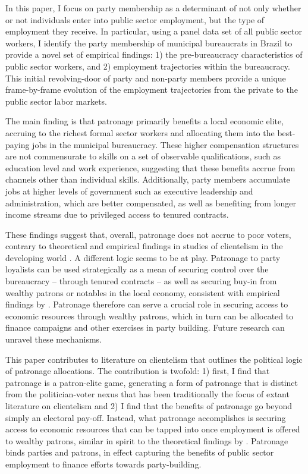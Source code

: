 In this paper, I focus on party membership as a determinant of not only whether or not individuals enter into public sector employment, but the type of employment they receive. In particular, using a panel data set of all public sector workers, I identify the party membership of municipal bureaucrats in Brazil to provide a novel set of empirical findings: 1) the pre-bureaucracy characteristics of public sector workers, and 2) employment trajectories within the bureaucracy. This initial revolving-door of party and non-party members provide a unique frame-by-frame evolution of the employment trajectories from the private to the public sector labor markets.

The main finding is that patronage primarily benefits a local economic elite, accruing to the richest formal sector workers and allocating them into the best-paying jobs in the municipal bureaucracy. These higher compensation structures are not commensurate to skills on a set of observable qualifications, such as education level and work experience, suggesting that these benefits accrue from channels other than individual skills. Additionally, party members accumulate jobs at higher levels of government such as executive leadership and administration, which are better compensated, as well as benefiting from longer income streams due to privileged access to tenured contracts.

These findings suggest that, overall, patronage does not accrue to poor voters, contrary to theoretical and empirical findings in studies of clientelism in the developing world \citep{stokes2013brokers}. A different logic seems to be at play. Patronage to party loyalists can be used strategically as a mean of securing control over the bureaucracy -- through tenured contracts -- as well as securing buy-in from wealthy patrons or notables in the local economy, consistent with empirical findings by \citet{colonnelli2018patronage}. Patronage therefore can serve a crucial role in securing access to economic resources through wealthy patrons, which in turn can be allocated to finance campaigns and other exercises in party building. Future research can unravel these mechanisms.

This paper contributes to literature on clientelism that outlines the political logic of patronage allocations. The contribution is twofold: 1) first, I find that patronage is a patron-elite game, generating a form of patronage that is distinct from the politician-voter nexus that has been traditionally the focus of extant literature on clientelism \citet{stokes2013brokers, diaz2016political} and 2) I find that the benefits of patronage go beyond simply an electoral pay-off. Instead, what patronage accomplishes is securing access to economic resources that can be tapped into once employment is offered to wealthy patrons, similar in spirit to the theoretical findings by \citet{robinson2013political}. Patronage binds parties and patrons, in effect capturing the benefits of public sector employment to finance efforts towards party-building.

